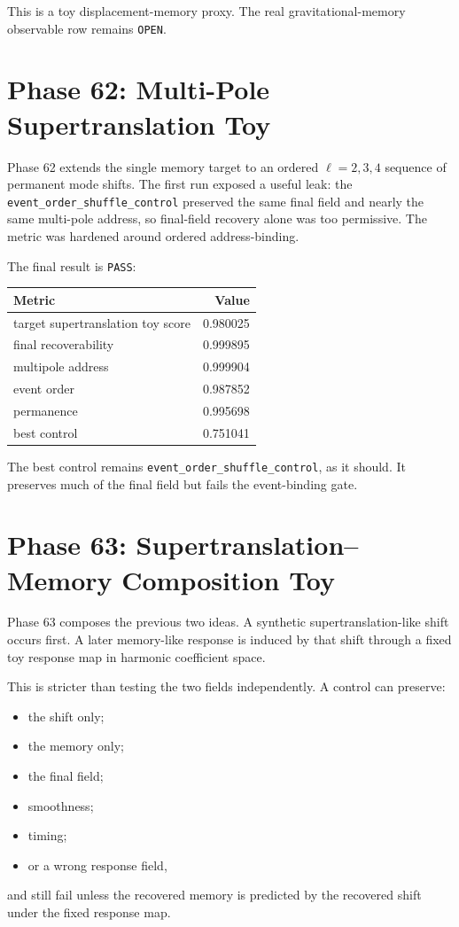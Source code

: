 \documentclass[11pt]{article}
\begin{document}
This is a toy displacement-memory proxy. The real gravitational-memory observable row remains \texttt{OPEN}.

\section{Phase 62: Multi-Pole Supertranslation Toy}

Phase 62 extends the single memory target to an ordered $\ell=2,3,4$ sequence of permanent mode shifts. The first run exposed a useful leak: the \texttt{event\_order\_shuffle\_control} preserved the same final field and nearly the same multi-pole address, so final-field recovery alone was too permissive. The metric was hardened around ordered address-binding.

The final result is \texttt{PASS}:
\begin{center}
\begin{tabular}{lr}
\toprule
Metric & Value \\
\midrule
target supertranslation toy score & 0.980025 \\
final recoverability & 0.999895 \\
multipole address & 0.999904 \\
event order & 0.987852 \\
permanence & 0.995698 \\
best control & 0.751041 \\
\bottomrule
\end{tabular}
\end{center}

The best control remains \texttt{event\_order\_shuffle\_control}, as it should. It preserves much of the final field but fails the event-binding gate.

\section{Phase 63: Supertranslation--Memory Composition Toy}

Phase 63 composes the previous two ideas. A synthetic supertranslation-like shift occurs first. A later memory-like response is induced by that shift through a fixed toy response map in harmonic coefficient space.

This is stricter than testing the two fields independently. A control can preserve:
\begin{itemize}
\item the shift only;
\item the memory only;
\item the final field;
\item smoothness;
\item timing;
\item or a wrong response field,
\end{itemize}
and still fail unless the recovered memory is predicted by the recovered shift under the fixed response map.
\end{document}
